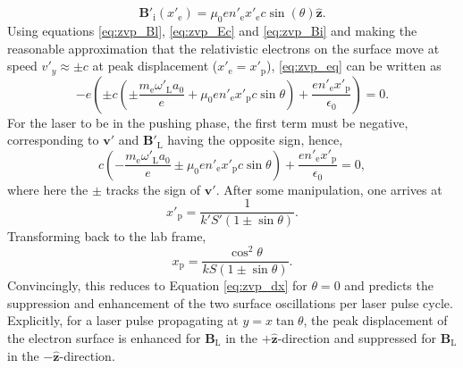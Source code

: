 \begin{equation}\label{eq:zvp_Bi}
	\mathbf{B}'_\mathrm{i}(x'_\mathrm{e}) = \mu_0 en'_\mathrm{e}x'_\mathrm{e}c\sin(\theta)\hat{\mathbf{z}}.
\end{equation}
Using equations \ref{eq:zvp_Bl}, \ref{eq:zvp_Ec} and \ref{eq:zvp_Bi} and making the reasonable approximation that the relativistic electrons on the surface move at speed $v'_y \approx \pm c$ at peak displacement ($x'_\mathrm{e} = x'_\mathrm{p}$), \ref{eq:zvp_eq} can be written as
\begin{equation}
	-e\left(\pm c\left(\pm\frac{m_\mathrm{e}\omega'_\mathrm{L}a_0}{e} + \mu_0 en'_\mathrm{e} x'_\mathrm{p}c\sin\theta\right)+\frac{en'_\mathrm{e}x'_\mathrm{p}}{\epsilon_0}\right) = 0.
\end{equation}
For the laser to be in the pushing phase, the first term must be negative, corresponding to $\mathbf{v'}$ and $\mathbf{B}'_\mathrm{L}$ having the opposite sign, hence,
\begin{equation}
	c\left(-\frac{m_\mathrm{e}\omega'_\mathrm{L}a_0}{e} \pm \mu_0 en'_\mathrm{e} x'_\mathrm{p}c\sin\theta\right)+\frac{en'_\mathrm{e}x'_\mathrm{p}}{\epsilon_0} = 0,
\end{equation}
where here the $\pm$ tracks the sign of $\mathbf{v}'$. After some manipulation, one arrives at
\begin{equation}
	x'_\mathrm{p} = \frac{1}{k'S' (1\pm \sin\theta)}.
\end{equation}
Transforming back to the lab frame,
\begin{equation}
	x_\mathrm{p} = \frac{\cos^2\theta}{kS(1\pm \sin\theta)}.
\end{equation}
Convincingly, this reduces to Equation \ref{eq:zvp_dx} for $\theta =0$ and predicts the suppression and enhancement of the two surface oscillations per laser pulse cycle. Explicitly, for a laser pulse propagating at $y = x\tan\theta$, the peak displacement of the electron surface is enhanced for $\mathbf{B}_\mathrm{L}$ in the $+\hat{\mathbf{z}}$-direction and suppressed for $\mathbf{B}_\mathrm{L}$ in the $-\hat{\mathbf{z}}$-direction.

